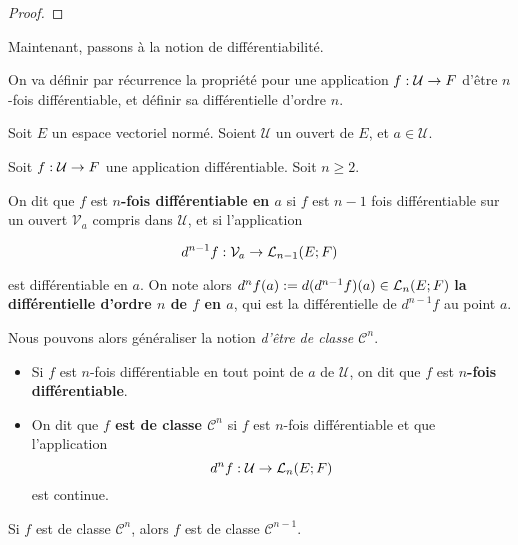 \ifdefined\outputproof
\begin{proof}

\end{proof}
\fi

Maintenant, passons à la notion de différentiabilité.

On va définir par récurrence la propriété pour une application
$\GSfunction{f}{\mathcal{U}}{F}$ d'être $n$-fois différentiable, et définir
sa différentielle d'ordre $n$.

\begin{definition}
	Soit $E$ un espace vectoriel normé. Soient $\mathcal{U}$ un ouvert de $E$,
	et $a \in \mathcal{U}$.

	Soit $\GSfunction{f}{\mathcal{U}}{F}$ une application différentiable.
	Soit $n \geq 2$.

	On dit que $f$ est \textbf{$n$-fois différentiable en $a$} si $f$ est $n - 1$ fois
	différentiable sur un ouvert $\mathcal{V}_{a}$ compris dans $\mathcal{U}$,
	et si l'application

	\begin{equation*}
		d^{n - 1} f : \mathcal{V}_{a} \rightarrow \GScontinueHomo[n -1]{E}{F}
	\end{equation*}

	est différentiable en $a$.
	On note alors $d^{n} f (a) := d (d^{n - 1}f) (a) \in
	\GScontinueHomo[n]{E}{F}$ \textbf{la
	différentielle d'ordre $n$ de $f$ en $a$}, qui est la différentielle de
	$d^{n - 1} f$ au point $a$.
\end{definition}

Nous pouvons alors généraliser la notion \textit{d'être de classe
	$\mathcal{C}^{n}$}.

\begin{definition}
	\begin{itemize}
		\item Si $f$ est $n$-fois différentiable en tout point de $a$ de
			$\mathcal{U}$, on dit que $f$ est \textbf{$n$-fois différentiable}.
		\item On dit que \textbf{$f$ est de classe $\mathcal{C}^{n}$} si $f$ est
			$n$-fois différentiable et que l'application
			\begin{equation*}
				d^{n} f : \mathcal{U} \rightarrow \GScontinueHomo[n]{E}{F}
			\end{equation*}
			est continue.
	\end{itemize}
\end{definition}

\begin{remarque}
	Si $f$ est de classe $\mathcal{C}^{n}$, alors $f$ est de classe
	$\mathcal{C}^{n - 1}$.
\end{remarque}

